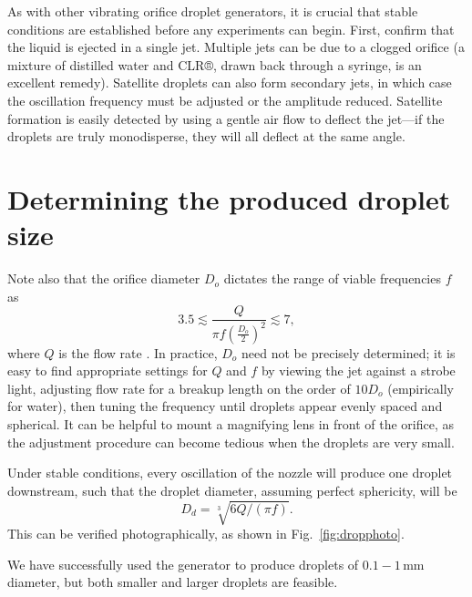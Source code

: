 \documentclass[11.5pt,oneside]{book}
\newcommand*{\figref}[1]{Fig.~\ref{#1}}
\begin{document}
As with other vibrating orifice droplet generators, it is crucial that stable
conditions are established before any experiments can begin. First, confirm that
the liquid is ejected in a single jet. Multiple jets can be due to a clogged
orifice (a mixture of distilled water and CLR®, drawn back through a
syringe, is an excellent remedy). Satellite droplets can also form secondary
jets, in which case the oscillation frequency must be adjusted or the amplitude
reduced. Satellite formation is easily detected by using a gentle air flow to
deflect the jet---if the droplets are truly monodisperse, they will all deflect
at the same angle.\cite{Strom69}

\section{Determining the produced droplet size}
Note also that the orifice diameter $D_o$ dictates the range of viable
frequencies $f$ as 
\begin{equation}
    3.5 \lesssim \frac{Q}{\pi f \left(\frac{D_o}{2}\right)^2}
\lesssim 7,
\end{equation}
where $Q$ is the flow rate \cite{Savart33, Rayleigh79}. In
practice, $D_o$ need not be
precisely determined; it is easy to find appropriate settings for $Q$
and $f$ by viewing the jet against a strobe light, adjusting flow rate for a breakup
length on the order of $10 D_o$ (empirically for water), then tuning the frequency
until droplets appear evenly spaced and spherical. It can be helpful to mount a
magnifying lens in front of the orifice, as the adjustment procedure can become
tedious when the droplets are very small.

Under stable conditions, every oscillation of the nozzle will produce one droplet
downstream, such that the droplet diameter, assuming perfect sphericity, will be 
\begin{equation}
        D_d = \sqrt[3]{6Q/(\pi f)}.\label{eq:rayl}
\end{equation}
This can be verified photographically, as shown in \figref{fig:dropphoto}.

We have successfully used the generator to produce droplets of
$0.1-1\,$mm diameter, but both smaller and larger droplets are feasible.
\end{document}

